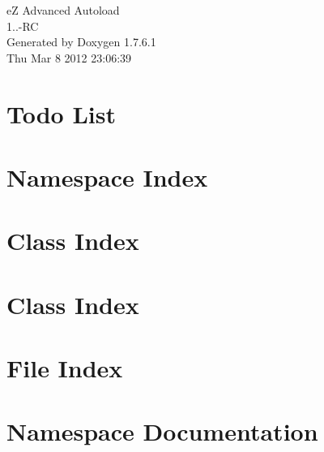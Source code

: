 \documentclass[a4paper]{book}
\begin{document}
\hypersetup{pageanchor=false,citecolor=blue}
\begin{titlepage}
\vspace*{7cm}
\begin{center}
{\Large e\-Z \-Advanced \-Autoload \\[1ex]\large 1..-\/\-R\-C }\\
\vspace*{1cm}
{\large \-Generated by Doxygen 1.7.6.1}\\
\vspace*{0.5cm}
{\small Thu Mar 8 2012 23:06:39}\\
\end{center}
\end{titlepage}
\clearemptydoublepage
{}
\tableofcontents
\clearemptydoublepage
{}
\hypersetup{pageanchor=true,citecolor=blue}
\chapter{\-Todo \-List}
\label{todo}
\hypertarget{todo}{}

\chapter{\-Namespace \-Index}

\chapter{\-Class \-Index}

\chapter{\-Class \-Index}

\chapter{\-File \-Index}

\chapter{\-Namespace \-Documentation}








\end{document}
